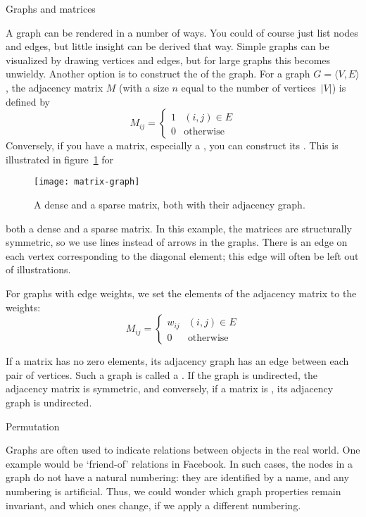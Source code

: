  {Graphs and matrices}
\label{sec:adj-matrix}

A graph can be rendered in a number of ways. You could of course just
list nodes and edges, but little insight can be derived that way.
Simple graphs can be  visualized by drawing vertices and edges, but
for large graphs this becomes unwieldy. Another option is to construct
the  of the graph.
For a graph $G=\langle V,E\rangle$,
the adjacency matrix $M$ (with a size $n$ equal to the
number of vertices~$|V|$) is defined by
\[ 
  M_{ij}=
  \begin{cases}1&(i,j)\in E\\ 0&\mbox{otherwise}\end{cases}
\]
Conversely, if you have a matrix, especially a
, you can construct its
.
This is illustrated in figure~\ref{fig:matrix-graph} for
\begin{figure}[ht]
  \texttt{[image: matrix-graph]}
  \caption{A dense and a sparse matrix, both with their adjacency
    graph.}
  \label{fig:matrix-graph}
\end{figure}
both a dense and a sparse matrix. In this example, the matrices are
structurally symmetric, so we use lines instead of arrows in the
graphs. There is an edge on each vertex corresponding to the diagonal
element; this edge will often be left out of illustrations.

For graphs with edge weights, we set the elements of the adjacency
matrix to the weights:
\[ 
  M_{ij}=
  \begin{cases}w_{ij}&(i,j)\in E\\ 0&\mbox{otherwise}\end{cases}
\]

If a matrix has no zero elements, its adjacency graph has an edge
between each pair of vertices. Such a graph is called a
.
If the graph is undirected, the adjacency matrix is symmetric, and
conversely, if a matrix is , its
adjacency graph is undirected.

 {Permutation}

Graphs are often used to indicate relations between objects in the 
real world. One example would be `friend-of' relations in Facebook.
In such cases, the nodes in a graph do not have a natural numbering:
they are identified by a name, and any numbering is artificial.
Thus, we could wonder which graph properties remain invariant,
and which ones change, if we apply a different numbering.

